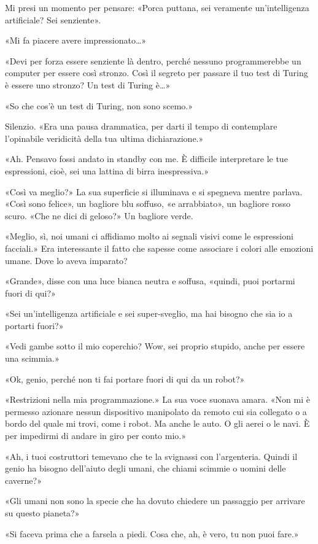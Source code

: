 Mi presi un momento per pensare: «Porca puttana, sei veramente
un'intelligenza artificiale? Sei senziente».

«Mi fa piacere avere impressionato\ldots»

«Devi per forza essere senziente là dentro, perché nessuno
programmerebbe un computer per essere così stronzo. Così il segreto per
passare il tuo test di Turing è essere uno stronzo? Un test di Turing
è\ldots»

«So che cos'è un test di Turing, non sono scemo.»

Silenzio. «Era una pausa drammatica, per darti il tempo di contemplare
l'opinabile veridicità della tua ultima dichiarazione.»

«Ah. Pensavo fossi andato in standby con me. È difficile interpretare le
tue espressioni, cioè, sei una lattina di birra inespressiva.»

«Così va meglio?» La sua superficie si illuminava e si spegneva mentre
parlava. «Così sono felice», un bagliore blu soffuso, «e arrabbiato», un
bagliore rosso scuro. «Che ne dici di geloso?» Un bagliore verde.

«Meglio, sì, noi umani ci affidiamo molto ai segnali visivi come le
espressioni facciali.» Era interessante il fatto che sapesse come
associare i colori alle emozioni umane. Dove lo aveva imparato?

«Grande», disse con una luce bianca neutra e soffusa, «quindi, puoi
portarmi fuori di qui?»

«Sei un'intelligenza artificiale e sei super-sveglio, ma hai bisogno che
sia io a portarti fuori?»

«Vedi gambe sotto il mio coperchio? Wow, sei proprio stupido, anche per
essere una scimmia.»

«Ok, genio, perché non ti fai portare fuori di qui da un robot?»

«Restrizioni nella mia programmazione.» La sua voce suonava amara. «Non
mi è permesso azionare nessun dispositivo manipolato da remoto cui sia
collegato o a bordo del quale mi trovi, come i robot. Ma anche le auto.
O gli aerei o le navi. È per impedirmi di andare in giro per conto mio.»

«Ah, i tuoi costruttori temevano che te la svignassi con l'argenteria.
Quindi il genio ha bisogno dell'aiuto degli umani, che chiami scimmie o
uomini delle caverne?»

«Gli umani non sono la specie che ha dovuto chiedere un passaggio per
arrivare su questo pianeta?»

«Si faceva prima che a farsela a piedi. Cosa che, ah, è vero, tu non
puoi fare.»

